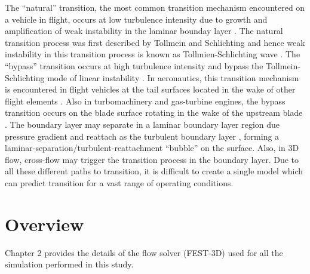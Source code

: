   The ``natural'' transition, the most common transition mechanism encountered on a vehicle in flight, occurs at low turbulence intensity due to growth and amplification of weak instability in the laminar bounday layer \citep{1956VanIngen}.
  The natural transition process was first described by Tollmein and Schlichting and hence weak instability in this transition process is known as Tollmien-Schlichting wave \citep{1974Schlichting}. 
  The ``bypass'' transition occurs at high turbulence intensity  and bypass the Tollmein-Schlichting mode of linear instability \citep{1969Morkovin}. In aeronautics, this transition mechanism is encountered in flight vehicles at the tail surfaces located in the wake of other flight elements \citep{2006Langtry}. 
  Also in turbomachinery and gas-turbine engines, the bypass transition occurs on the blade surface rotating in the wake of the upstream blade \citep{1991Mayle}. 
  The boundary layer may separate in a laminar boundary layer region due pressure gradient and reattach as the turbulent boundary layer \citep{1991Mayle}, forming a laminar-separation/turbulent-reattachment ``bubble'' on the surface.
  Also, in 3D flow, cross-flow may trigger the transition process in the boundary layer. Due to all these different paths to transition, it is difficult to create a single model which can predict transition for a vast range of operating conditions. 



\section{Overview}

Chapter 2 provides the details of the flow solver (FEST-3D) used for all the simulation performed in this study. 

%
